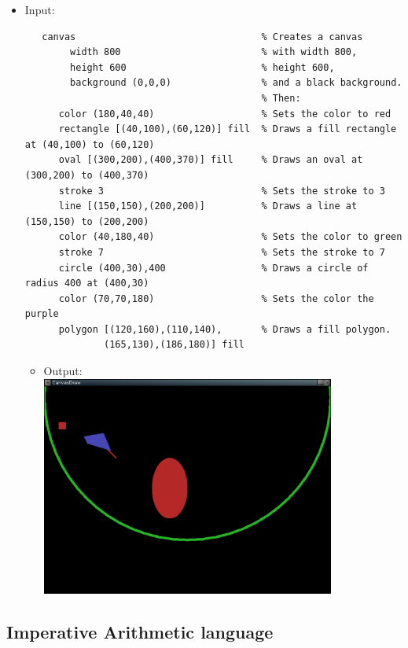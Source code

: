 \documentclass[a4paper,twoside,onecolumn]{article}
\begin{document}
\begin{itemize}
\item Input:
\begin{verbatim}
   canvas                                 % Creates a canvas
        width 800                         % with width 800,
        height 600                        % height 600,
        background (0,0,0)                % and a black background.
                                          % Then:
      color (180,40,40)                   % Sets the color to red
      rectangle [(40,100),(60,120)] fill  % Draws a fill rectangle at (40,100) to (60,120)
      oval [(300,200),(400,370)] fill     % Draws an oval at (300,200) to (400,370)
      stroke 3                            % Sets the stroke to 3
      line [(150,150),(200,200)]          % Draws a line at (150,150) to (200,200)
      color (40,180,40)                   % Sets the color to green
      stroke 7                            % Sets the stroke to 7
      circle (400,30),400                 % Draws a circle of radius 400 at (400,30)
      color (70,70,180)                   % Sets the color the purple
      polygon [(120,160),(110,140),       % Draws a fill polygon.
              (165,130),(186,180)] fill
\end{verbatim}
\begin{itemize} \item Output: \\
\includegraphics[width=0.80\textwidth]{canvas2.eps}
\end{itemize}
\end{itemize}


\subsection{Imperative Arithmetic language} \label{sec:langimpa}
\end{document}
